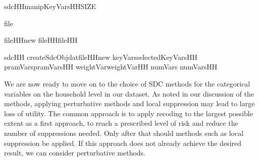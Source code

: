 \documentclass[letterpaper,10pt,english]{sphinxmanual}
\begin{document}
\def\sphinxLiteralBlockLabel{\label{\detokenize{casestudies:code915}}}
%
\begin{sphinxVerbatim}[commandchars=\\\{\},numbers=left,firstnumber=1,stepnumber=1]
sdcHHmanipKeyVarsHHSIZE

file  \PYG{p}{[}\PYG{p}{[}\PYG{p}{]}  \PYG{p}{]}

fileHHnew  fileHH\PYG{p}{[}fileHH\PYG{p}{[}\PYG{p}{]}  \PYG{p}{]}

sdcHH  createSdcObjdatfileHHnew keyVarsselectedKeyVarsHH pramVarspramVarsHH
                      weightVarweightVarHH numVars  numVarsHH
\end{sphinxVerbatim}


We are now ready to move on to the choice of SDC methods for the
categorical variables on the household level in our dataset. As noted in
our discussion of the methods, applying perturbative methods and local
suppression may lead to large loss of utility. The common approach is to
apply recoding to the largest possible extent as a first approach, to
reach a prescribed level of risk and reduce the number of suppressions
needed. Only after that should methods such as local suppression be
applied. If this approach does not already achieve the desired result,
we can consider perturbative methods.
\end{document}
